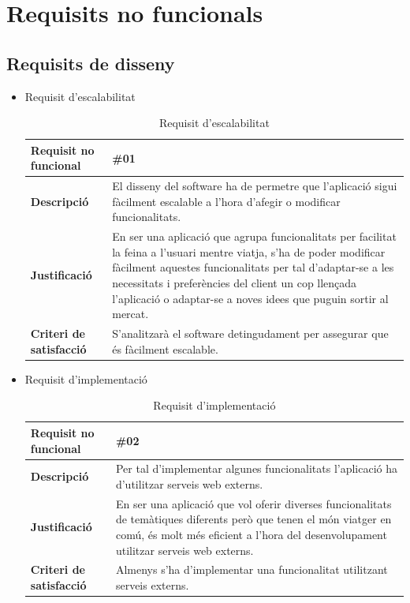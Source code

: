 \clearpage


\section{Requisits no funcionals}

\subsection{Requisits de disseny}
\begin{itemize}
\item{Requisit d'escalabilitat}

\begin{table}[!h]
\begin{tabular}{|l|M|}
\hline
\textbf{Requisit no funcional }& \#01    \\ \hline
\textbf{Descripció} &  El disseny del software ha de permetre que l’aplicació
sigui fàcilment escalable a l’hora d’afegir o modificar
funcionalitats.
 \\ \hline
\textbf{Justificació} & En ser una aplicació que agrupa funcionalitats per facilitat la feina a l’usuari mentre viatja, s’ha de poder modificar fàcilment aquestes funcionalitats per tal d’adaptar-se a les necessitats i preferències del client un cop llençada l’aplicació o adaptar-se a noves idees que puguin sortir al mercat.  \\ \hline
\textbf{Criteri de satisfacció} & S’analitzarà el software detingudament per assegurar que és fàcilment escalable.  \\ \hline
\end{tabular}
\label{}
\caption{Requisit d'escalabilitat}
\end{table}

\item{Requisit d'implementació}

\begin{table}[!h]
\begin{tabular}{|l|M|}
\hline
\textbf{Requisit no funcional }& \#02    \\ \hline
\textbf{Descripció} &  Per tal d’implementar algunes funcionalitats l’aplicació ha d’utilitzar serveis web externs. \\ \hline
\textbf{Justificació} & En ser una aplicació que vol oferir diverses funcionalitats de temàtiques diferents però que tenen el món
viatger en comú, és molt més eficient a l’hora del
desenvolupament utilitzar serveis web externs.  \\ \hline
\textbf{Criteri de satisfacció} & Almenys s’ha d’implementar una funcionalitat utilitzant serveis externs.
 \\ \hline
\end{tabular}
\label{}
\caption{Requisit d'implementació}
\end{table}

\end{itemize}


